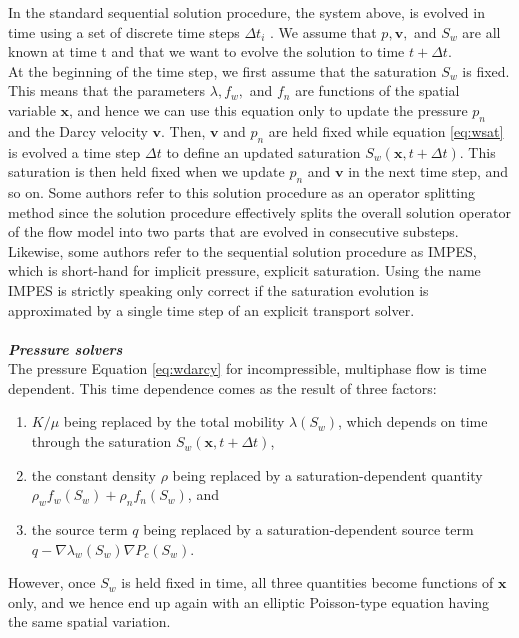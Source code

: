 \documentclass[12pt]{article}
\begin{document}
In the standard sequential solution procedure, the system above, is
evolved in time using a set of discrete time steps $\Delta t_i$ . We assume that $p, \mathbf{v},$
and $S_w$ are all known at time t and that we want to evolve the solution to time
$t + \Delta t$.\\
At the beginning of the time step, we first assume that the saturation
$S_w$ is fixed. This means that the parameters $\lambda, f_w ,$ and $f_n$ are 
functions of the spatial variable $\mathbf{x}$, and hence we can use this equation only to update the pressure $p_n$ and the Darcy velocity $\mathbf{v}$. Then, $\mathbf{v}$ and $p_n$ are held
fixed while equation \ref{eq:wsat} is evolved a time step $\Delta t$ to define an updated saturation $S_w (\mathbf{x}, t + \Delta t)$. This saturation is then held fixed when we update $p_n$ and $\mathbf{v}$ in the next time step, and so on.
Some authors refer to this solution procedure as an operator splitting
method since the solution procedure effectively splits the overall solution operator of the flow model into two parts that are evolved in consecutive substeps.
Likewise, some authors refer to the sequential solution procedure as IMPES,
which is short-hand for implicit pressure, explicit saturation. Using the name
IMPES is strictly speaking only correct if the saturation evolution is approximated by a single time step of an explicit transport solver.\\\\
\emph{\textbf{Pressure solvers}}\\
The pressure Equation \eqref{eq:wdarcy} for incompressible, multiphase flow is time dependent. This time dependence comes as the result of three factors:
\begin{enumerate}
 \item $K/\mu$ being replaced by the total mobility $\lambda(S_w )$, which depends on time through the saturation $S_w (\mathbf{x}, t + \Delta t)$,
 \item the constant density $\rho$ being replaced by a saturation-dependent quantity $\rho_w f_w (S_w ) + \rho_nf_n (S_w )$, and
 \item the source term $q$ being replaced by a saturation-dependent source term
$q − \nabla \lambda_w (S_w )\nabla P_c (S_w )$.
\end{enumerate}
However, once $S_w$ is held fixed in time, all three quantities become functions of $\mathbf{x}$ only, and we hence end up again with an elliptic Poisson-type equation having the same spatial variation. \\
\end{document}
